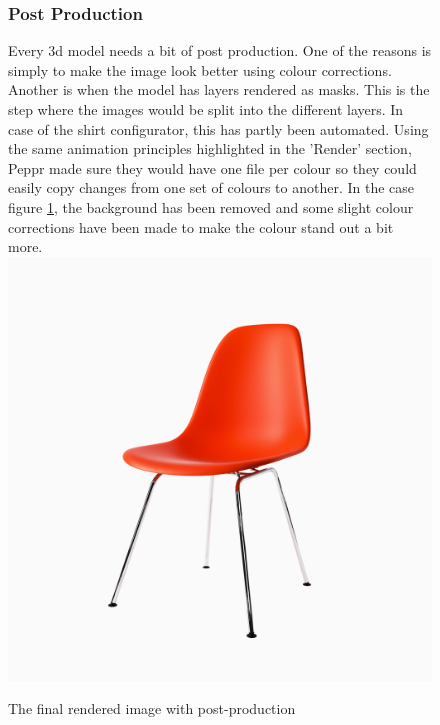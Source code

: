 \begin{figure}

\subsubsection{Post Production}
Every 3d model needs a bit of post production. One of the reasons is simply to make the image look better using colour corrections. Another is when the model has layers rendered as masks. This is the step where the images would be split into the different layers. In case of the shirt configurator, this has partly been automated. Using the same animation principles highlighted in the 'Render' section, Peppr made sure they would have one file per colour so they could easily copy changes from one set of colours to another. In the case figure \ref{figure:post_production}, the background has been removed and some slight colour corrections have been made to make the colour stand out a bit more.
\newline
\centering
\includegraphics[width=15cm]{images/post}
\caption{The final rendered image with post-production}
\label{figure:post_production}
\end{figure}
